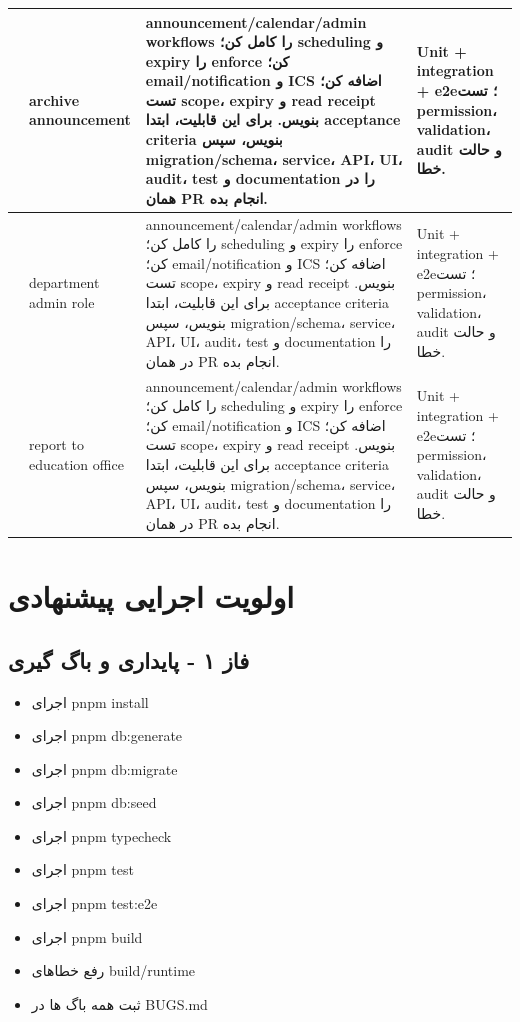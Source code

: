 \documentclass[11pt,a4paper]{article}
\begin{document}
\begin{longtable}{|>{\raggedleft\arraybackslash}p{}|>{\raggedleft\arraybackslash}p{}|>{\raggedleft\arraybackslash}p{}|>{\raggedleft\arraybackslash}p{}|}
298 & archive announcement & announcement/calendar/admin workflows را کامل کن؛ scheduling و expiry را enforce کن؛ email/notification و ICS اضافه کن؛ تست scope، expiry و read receipt بنویس. برای این قابلیت، ابتدا acceptance criteria بنویس، سپس migration/schema، service، API، UI، audit، test و documentation را در همان PR انجام بده. & Unit + integration + e2e؛ تست permission، validation، audit و حالت خطا. \\ \hline
299 & department admin role & announcement/calendar/admin workflows را کامل کن؛ scheduling و expiry را enforce کن؛ email/notification و ICS اضافه کن؛ تست scope، expiry و read receipt بنویس. برای این قابلیت، ابتدا acceptance criteria بنویس، سپس migration/schema، service، API، UI، audit، test و documentation را در همان PR انجام بده. & Unit + integration + e2e؛ تست permission، validation، audit و حالت خطا. \\ \hline
300 & report to education office & announcement/calendar/admin workflows را کامل کن؛ scheduling و expiry را enforce کن؛ email/notification و ICS اضافه کن؛ تست scope، expiry و read receipt بنویس. برای این قابلیت، ابتدا acceptance criteria بنویس، سپس migration/schema، service، API، UI، audit، test و documentation را در همان PR انجام بده. & Unit + integration + e2e؛ تست permission، validation، audit و حالت خطا. \\ \hline
\end{longtable}
\section{اولویت اجرایی پیشنهادی}
\subsection{فاز ۱ - پایداری و باگ گیری}
\begin{itemize}
\item اجرای pnpm install
\item اجرای pnpm db:generate
\item اجرای pnpm db:migrate
\item اجرای pnpm db:seed
\item اجرای pnpm typecheck
\item اجرای pnpm test
\item اجرای pnpm test:e2e
\item اجرای pnpm build
\item رفع خطاهای build/runtime
\item ثبت همه باگ ها در BUGS.md
\end{itemize}
\end{document}
